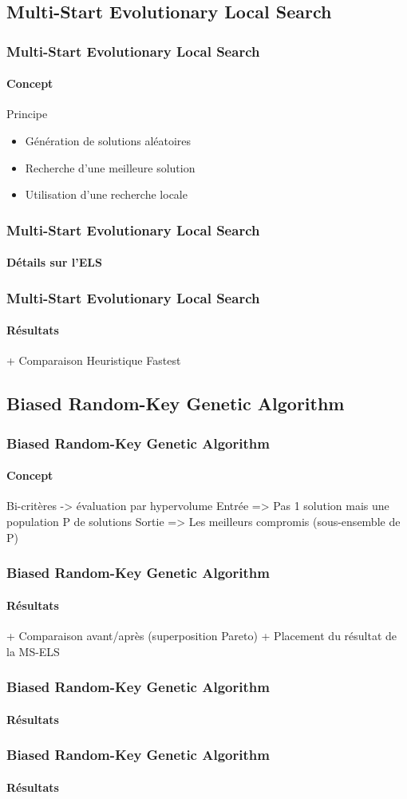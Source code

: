 \subsection{Multi-Start Evolutionary Local Search}
\begin{frame}
	\frametitle{Multi-Start Evolutionary Local Search}
	\framesubtitle{Concept}
	\begin{block}{Principe}
		\begin{itemize}
			\item Génération de solutions aléatoires
			\item Recherche d'une meilleure solution
			\item Utilisation d'une recherche locale
		\end{itemize}
	\end{block}
\end{frame}
\begin{frame}
	\frametitle{Multi-Start Evolutionary Local Search}
	\framesubtitle{Détails sur l'ELS}
	\centering
	\begin{tikzpicture}[scale=.5,transform shape,node distance=1cm]
		
	\end{tikzpicture}
\end{frame}
\begin{frame}
	\frametitle{Multi-Start Evolutionary Local Search}
	\framesubtitle{Résultats}
	+ Comparaison Heuristique Fastest
\end{frame}

\subsection{Biased Random-Key Genetic Algorithm}
\begin{frame}
	\frametitle{Biased Random-Key Genetic Algorithm}
	\framesubtitle{Concept}
	Bi-critères -> évaluation par hypervolume
	Entrée => Pas 1 solution mais une population P de solutions
	Sortie => Les meilleurs compromis (sous-ensemble de P)
\end{frame}
\begin{frame}
	\frametitle{Biased Random-Key Genetic Algorithm}
	\framesubtitle{Résultats}
	+ Comparaison avant/après (superposition Pareto)
	+ Placement du résultat de la MS-ELS
\end{frame}
\begin{frame}
	\frametitle{Biased Random-Key Genetic Algorithm}
	\framesubtitle{Résultats}
	
\end{frame}
\begin{frame}
	\frametitle{Biased Random-Key Genetic Algorithm}
	\framesubtitle{Résultats}
	
\end{frame}
